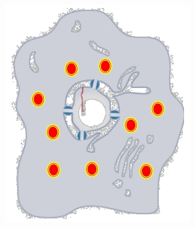 \documentclass[]{article}
\begin{document}
\begin{figure}[H]
\begin{subfigure}[b]{0.45\textwidth}
		\includegraphics[width=\textwidth]{OutsideIn4}
	\end{subfigure}
\end{figure}
\end{document}
